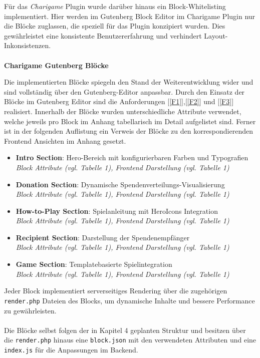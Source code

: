 Für das \textit{Charigame} Plugin wurde darüber hinaus ein Block-Whitelisting implementiert.
Hier werden im Gutenberg Block Editor im Charigame Plugin nur die Blöcke zuglassen, die speziell für das Plugin konzipiert wurden.
Dies gewährleistet eine konsistente Benutzererfahrung und verhindert Layout-Inkonsistenzen.
\\\\
\textbf{Charigame Gutenberg Blöcke}

Die implementierten Blöcke spiegeln den Stand der Weiterentwicklung wider und sind vollständig über den Gutenberg-Editor anpassbar.
Durch den Einsatz der Blöcke im Gutenberg Editor sind die Anforderungen [\ref{F1}],[\ref{F2}] und [\ref{F3}] realisiert.
Innerhalb der Blöcke wurden unterschiedliche Attribute verwendet, welche jeweils pro Block im Anhang tabellarisch im Detail aufgelistet sind.
Ferner ist in der folgenden Auflistung ein Verweis der Blöcke zu den korrespondierenden Frontend Ansichten im Anhang gesetzt.
\begin{itemize}
    \item \textbf{Intro Section}: Hero-Bereich mit konfigurierbaren Farben und Typografien\\
    \emph{Block Attribute (vgl. Tabelle 1), Frontend Darstellung (vgl. Tabelle 1)}
    \item \textbf{Donation Section}: Dynamische Spendenverteilungs-Visualisierung\\
    \emph{Block Attribute (vgl. Tabelle 1), Frontend Darstellung (vgl. Tabelle 1)}
    \item \textbf{How-to-Play Section}: Spielanleitung mit HeroIcons Integration\\
    \emph{Block Attribute (vgl. Tabelle 1), Frontend Darstellung (vgl. Tabelle 1)}
    \item \textbf{Recipient Section}: Darstellung der Spendenempfänger\\
    \emph{Block Attribute (vgl. Tabelle 1), Frontend Darstellung (vgl. Tabelle 1)}
    \item \textbf{Game Section}: Templatebasierte Spielintegration\\
    \emph{Block Attribute (vgl. Tabelle 1), Frontend Darstellung (vgl. Tabelle 1)}
\end{itemize}
\newpage
Jeder Block implementiert serverseitiges Rendering über die zugehörigen \texttt{render.php} Dateien des Blocks, um dynamische Inhalte und bessere Performance zu gewährleisten.\\\\
Die Blöcke selbst folgen der in Kapitel 4 geplanten Struktur und besitzen über die \texttt{render.php} hinaus eine \texttt{block.json} mit den verwendeten Attributen und eine \texttt{index.js} für die Anpassungen im Backend.

